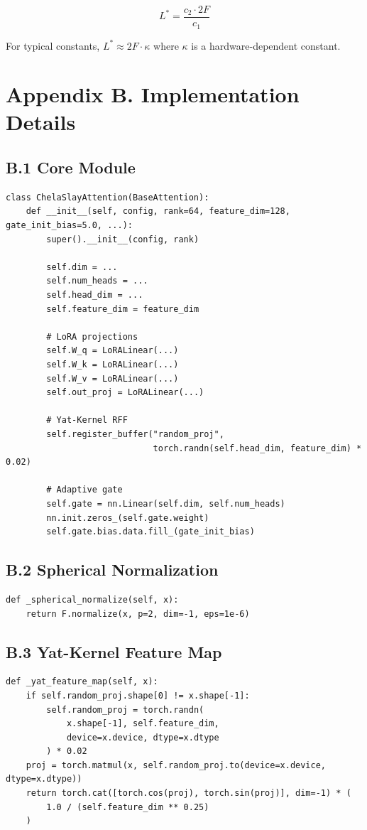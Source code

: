 \[
L^* = \frac{c_2 \cdot 2F}{c_1}
\]

For typical constants, $L^* \approx 2F \cdot \kappa$ where $\kappa$ is a 
hardware-dependent constant.



\section{Appendix B. Implementation Details}

\subsection{B.1 Core Module}

\begin{lstlisting}
class ChelaSlayAttention(BaseAttention):
    def __init__(self, config, rank=64, feature_dim=128, gate_init_bias=5.0, ...):
        super().__init__(config, rank)
        
        self.dim = ...
        self.num_heads = ...
        self.head_dim = ...
        self.feature_dim = feature_dim
        
        # LoRA projections
        self.W_q = LoRALinear(...)
        self.W_k = LoRALinear(...)
        self.W_v = LoRALinear(...)
        self.out_proj = LoRALinear(...)
        
        # Yat-Kernel RFF
        self.register_buffer("random_proj", 
                             torch.randn(self.head_dim, feature_dim) * 0.02)
        
        # Adaptive gate
        self.gate = nn.Linear(self.dim, self.num_heads)
        nn.init.zeros_(self.gate.weight)
        self.gate.bias.data.fill_(gate_init_bias)
\end{lstlisting}

\subsection{B.2 Spherical Normalization}

\begin{lstlisting}
def _spherical_normalize(self, x):
    return F.normalize(x, p=2, dim=-1, eps=1e-6)
\end{lstlisting}

\subsection{B.3 Yat-Kernel Feature Map}

\begin{lstlisting}
def _yat_feature_map(self, x):
    if self.random_proj.shape[0] != x.shape[-1]:
        self.random_proj = torch.randn(
            x.shape[-1], self.feature_dim, 
            device=x.device, dtype=x.dtype
        ) * 0.02
    proj = torch.matmul(x, self.random_proj.to(device=x.device, dtype=x.dtype))
    return torch.cat([torch.cos(proj), torch.sin(proj)], dim=-1) * (
        1.0 / (self.feature_dim ** 0.25)
    )
\end{lstlisting}

